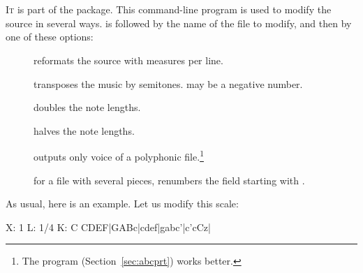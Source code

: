\documentclass[a4paper,12pt]{book}
\begin{document}







\section{}

\lettrine{I}{t} is part of the \abcMID{} package. This command-line
program is used to modify the \ABC{} source in several ways.
 is followed by the name of the file to modify, and then
by one of these options:

\begin{description}
  
  \item [ ] reformats the source with  measures
  per line.
  
  \item [ ] transposes the music by  semitones.
   may be a negative number.
  
  \item [] doubles the note lengths.
  
  \item [] halves the note lengths.
  
  \item [ ] outputs only voice  of a
  polyphonic file.\footnote{The program 
  (Section~\ref{sec:abcprt}) works better.}
  
  \item [ ] for a file with several pieces, renumbers the
   field starting with .
  
\end{description}

As usual, here is an example. Let us modify this scale:

\begin{abcsource}
X: 1
L: 1/4
K: C
CDEF|GABc|cdef|gabc'|c'cCz|
\end{abcsource}
\end{document}
